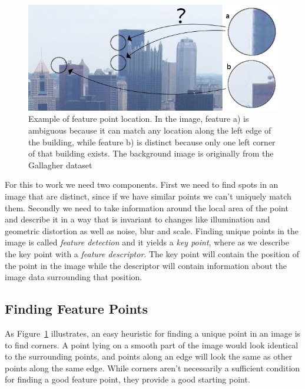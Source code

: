 \begin{figure}[t]
	\centering
	\includegraphics[width=1\columnwidth]{images/feature_point}
	\caption{Example of feature point location. In the image, feature a) 
is ambiguous because it can match any location along the left edge of 
the building, while feature b) is distinct because only one left corner 
of that building exists. The background image is originally from the 
Gallagher dataset \cite{gallagher2008}}
	\label{fig:feature_point}
\end{figure}

For this to work we need two components. First we need to find spots in 
an image that are distinct, since if we have similar points we can't 
uniquely match them. Secondly we need to take information around the 
local area of the point and describe it in a way that is invariant to 
changes like illumination and geometric distortion as well as noise, 
blur and scale. Finding unique points in the image is called 
\emph{feature detection} and it yields a \emph{key point}, where as we 
describe the key point with a \emph{feature descriptor}. The key point 
will contain the position of the point in the image while the descriptor 
will contain information about the image data surrounding that position.

\subsection{Finding Feature Points}

As Figure~\ref{fig:feature_point} illustrates, an easy heuristic for 
finding a unique point in an image is to find corners. A point lying on 
a smooth part of the image would look identical to the surrounding 
points, and points along an edge will look the same as other points 
along the same edge. While corners aren't necessarily a sufficient 
condition for finding a good feature point, they provide a good starting 
point.

